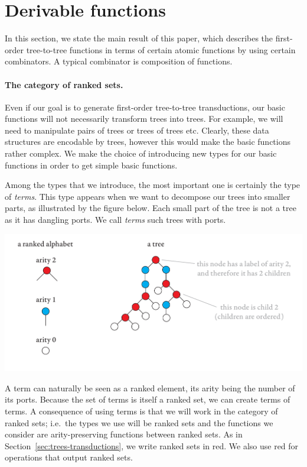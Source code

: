 \section{Derivable functions}
In this section, we state the main result of this paper, which describes  the  first-order tree-to-tree functions in terms of  certain atomic functions by using certain combinators.  A typical combinator is composition of functions.

\paragraph*{The category of ranked sets.} Even if our goal is to generate first-order tree-to-tree transductions, our basic functions will not necessarily transform trees into trees. For example, we will need to manipulate pairs of trees or trees of trees etc. Clearly, these data structures are encodable by trees, however this would make the basic functions rather complex. We make the choice of introducing new types for our basic functions in order to get simple basic functions.

Among the types that we introduce, the most important one is certainly the type of \emph{terms}. This type appears when we want to decompose our trees into smaller parts, as illustrated by the figure below. Each small part of the tree is not a tree as it has dangling ports.  We call \emph{terms} such trees with ports. 
\begin{center}
\includegraphics[scale=.32, page=15]{pics.pdf}
\end{center}
A term can naturally be seen as a ranked element, its arity being the number of its ports. Because the set of terms is itself a ranked set,  we can create terms of terms.  A consequence of using terms is that we will work in the category of ranked sets; i.e.~the types we use will be ranked sets and the functions we consider are arity-preserving functions between ranked sets. As in Section~\ref{sec:trees-transductions}, we write ranked sets in red. We also use red for operations that output ranked sets. 


